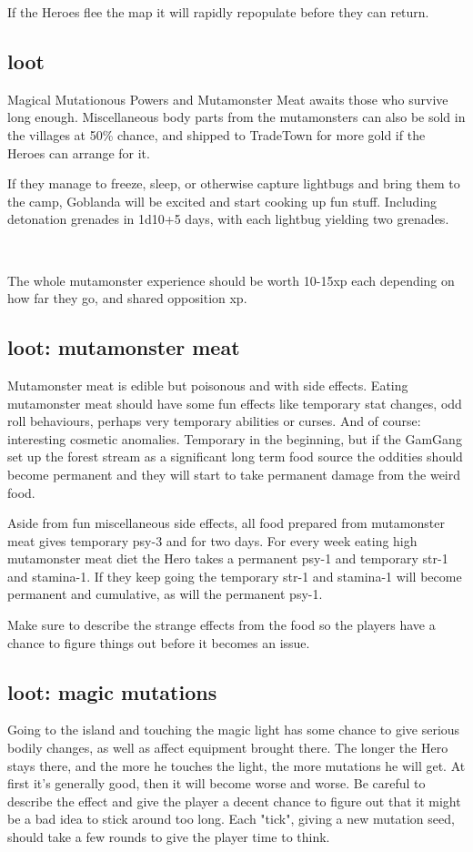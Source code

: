 If the Heroes flee the map it will rapidly repopulate before they can return.


\subsection*{loot}
Magical Mutationous Powers and Mutamonster Meat awaits those who survive long enough. Miscellaneous body parts from the mutamonsters can also be sold in the villages at 50\% chance, and shipped to TradeTown for more gold if the Heroes can arrange for it.

If they manage to freeze, sleep, or otherwise capture lightbugs and bring them to the camp, Goblanda will be excited and start cooking up fun stuff. Including detonation grenades in 1d10+5 days, with each lightbug yielding two grenades.

\

The whole mutamonster experience should be worth 10-15xp each depending on how far they go, and shared opposition xp.


\subsection*{loot: mutamonster meat}
Mutamonster meat is edible but poisonous and with side effects. Eating mutamonster meat should have some fun effects like temporary stat changes, odd roll behaviours, perhaps very temporary abilities or curses. And of course: interesting cosmetic anomalies. Temporary in the beginning, but if the GamGang set up the forest stream as a significant long term food source the oddities should become permanent and they will start to take permanent damage from the weird food.

Aside from fun miscellaneous side effects, all food prepared from mutamonster meat gives temporary psy-3 and for two days. For every week eating high mutamonster meat diet the Hero takes a permanent psy-1 and temporary str-1 and stamina-1. If they keep going the temporary str-1 and stamina-1 will become permanent and cumulative, as will the permanent psy-1.

Make sure to describe the strange effects from the food so the players have a chance to figure things out before it becomes an issue.


\subsection*{loot: magic mutations}
Going to the island and touching the magic light has some chance to give serious bodily changes, as well as affect equipment brought there. The longer the Hero stays there, and the more he touches the light, the more mutations he will get. At first it's generally good, then it will become worse and worse. Be careful to describe the effect and give the player a decent chance to figure out that it might be a bad idea to stick around too long. Each "tick", giving a new mutation seed, should take a few rounds to give the player time to think.

